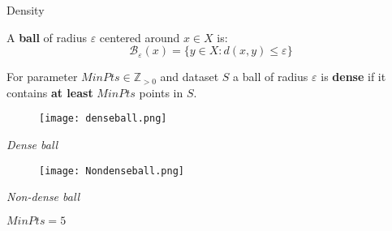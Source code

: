 \documentclass[aspectratio=169]{beamer}
\renewcommand{\epsilon}{\varepsilon}
\newcommand{\R}{\mathbb{R}}
\newcommand{\N}{\mathbb{N}}
\newcommand{\B}[2]{\mathcal{B}_{#1}\left(#2\right)}
\begin{document}
\begin{frame}{Density}
    
    A \textbf{ball} of radius $\epsilon$ centered around $x\in X$ is: \[\B{\epsilon}{x} = \{y\in X:d(x,y)\le\epsilon\}\]
    
    For parameter $MinPts\in\mathbb{Z}_{>0}$ and dataset $S$ a ball of radius $\epsilon$ is \textbf{dense} if it contains \textbf{at least} $MinPts$ points in $S$.

    \vspace{0.3cm}
    
  \centering
  \begin{minipage}[b]{0.45\textwidth}
    \begin{figure}
        \centering
        \texttt{[image: denseball.png]}
        \label{fig:enter-label}
    \end{figure}
    \begin{center}
        \textit{Dense ball}
    \end{center}
  \end{minipage}
  \hfill
  \begin{minipage}[b]{0.45\textwidth}
    \begin{figure}
        \centering
        \texttt{[image: Nondenseball.png]}
        \label{fig:enter-label}
    \end{figure}
    \begin{center}
        \textit{Non-dense ball}
    \end{center}
  \end{minipage}
  

    \raggedleft\footnotesize $MinPts=5$

    
\end{frame}
\begin{comment}
\begin{frame}{What is density?}
    We need to formalize the concept of density by some definitions:

    \begin{itemize}
        \item In a metric space $(X,d)$, a \textbf{ball} of radius $\epsilon$ centered around the point $x\in X$ is the set of points $\{y\in X:d(x,y)\le\epsilon\}$.
        \item Given $\epsilon\in\R$ and $MinPts\in\N$, we say that a ball of radius $\epsilon$ is \textbf{dense} if it contains at least $MinPts$ points.
        \item We also say that two points at distance $\le\epsilon$ are \textbf{neighbors}.
    \end{itemize}
    
\end{frame}
\end{comment}
\end{document}
